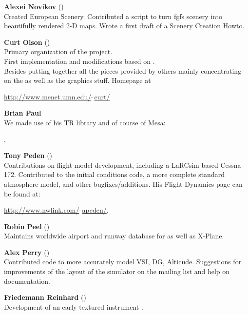 \noindent \textbf{Alexei Novikov}
()\\
  Created European Scenery. Contributed a script to turn fgfs scenery into beautifully rendered
  2-D maps. Wrote a first draft of a Scenery Creation Howto.
  \medskip

\noindent \textbf{Curt Olson} ()\\
 Primary organization of the project.\\
 First implementation and modifications based on .\\
 Besides putting together all the pieces provided by others mainly concentrating on the  as well as the graphics stuff. Homepage at

 \href{http://www.menet.umn.edu/~curt/}{http://www.menet.umn.edu/$\tilde{~~}$curt/}
 \medskip
 
\noindent \textbf{Brian Paul}\\
 We made use of his TR library and of course of Mesa:
 
 , 
 \medskip

\noindent \textbf{Tony Peden}  ()\\
  Contributions on flight model development, including a LaRCsim based
  Cessna 172. Contributed to  {\JSBSim} the initial conditions code, a more complete
  standard atmosphere model, and other bugfixes/additions.
  His Flight Dynamics page can be found at:
   \medskip

  \href{http://www.nwlink.com/~apeden}{http://www.nwlink.com/$\tilde{~~}$apeden/}.
  \medskip


\noindent \textbf{Robin Peel} ()\\
  Maintains worldwide airport and runway database for \FlightGear{} as well as X-Plane.
 \medskip

\noindent \textbf{Alex Perry} ()\\
 Contributed code to more accurately model VSI, DG, Alticude.
 Suggestions for improvements of the layout of the simulator on the mailing list
 and help on documentation.
 \medskip

\noindent \textbf{Friedemann Reinhard}
()\\
  Development of an early textured instrument .
 \medskip

